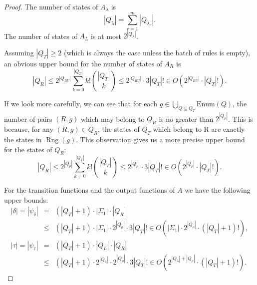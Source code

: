 \documentclass{article}
\newcommand{\len}[1]{\ensuremath{\left| #1 \right|}}
\DeclareMathOperator{\Rng}{Rng}
\begin{document}
	\begin{proof}
		The number of states of $A_\lambda$ is
		\[ \len{Q_\lambda} = \sum_{r=1}^{m} \len{Q_{\lambda_r}}. \]
		The number of states of $A_L$ is at most $2^{\len{Q_\lambda}}$.

		Assuming $\len{Q_T}\ge 2$ (which is always the case unless the batch of rules is empty),
		an obvious upper bound for the number of states of $A_R$ is
		\[ \len{Q_R} \le 2^{\len{Q_{RU}}} \sum_{k=0}^{\len{Q_T}} k!\binom{\len{Q_T}}{k}
			\le 2^{\len{Q_{RU}}}\cdot 3\len{Q_T}!\in O(2^{\len{Q_{RU}}}\cdot \len{Q_T}!).
		\]

		If we look more carefully, we can see that for each $g\in\bigcup_{Q\subseteq Q_T} \mathrm{Enum}(Q)$, the number of pairs $(R, g)$ which may belong to $Q_R$ is no greater than $2^{\len{Q_\rho}}$. This is because, for any $(R, g)\in Q_R$, the states of $Q_T$ which belong to R are exactly the states in $\Rng(g)$. This observation gives us a more precise upper bound for the states of $Q_R$:
		\[ \len{Q_R} \le 2^{\len{Q_\rho}} \sum_{k=0}^{\len{Q_T}} k!\binom{\len{Q_T}}{k}
			\le 2^{\len{Q_\rho}}\cdot 3\len{Q_T}!\in O(2^{\len{Q_\rho}}\cdot \len{Q_T}!).
		\]
		
		For the transition functions and the output functions of $A$ we have the following upper bounds:
		\begin{eqnarray*}
			\len{\delta} = \len{\psi_\delta} &=& (\len{Q_T}+1)\cdot\len{\Sigma_1}\cdot\len{Q_R} \\
				&\le& (\len{Q_T}+1)\cdot\len{\Sigma_1}\cdot 2^{\len{Q_\rho}}\cdot 3\len{Q_T}!
				\in O(\len{\Sigma_1}\cdot 2^{\len{Q_\rho}}\cdot(\len{Q_T}+1)!), \\
			\len{\tau} = \len{\psi_\tau} &=& (\len{Q_T}+1)\cdot\len{Q_L}\cdot\len{Q_R} \\
				&\le& (\len{Q_T}+1)\cdot2^{\len{Q_\lambda}}\cdot 2^{\len{Q_\rho}}\cdot 3\len{Q_T}!
				\in O(2^{\len{Q_\lambda}+\len{Q_\rho}}\cdot(\len{Q_T}+1)!).
		\end{eqnarray*}
	\end{proof}
\end{document}
